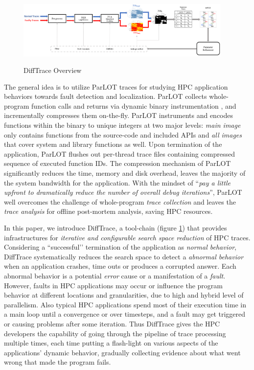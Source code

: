 \begin{figure}[]
\caption{DiffTrace Overview}
\includegraphics[width=0.95\textwidth]{figs/overview.png}
\label{fig.diffTraceOverview}
\end{figure}

The general idea is to utilize ParLOT \cite{ parlot} traces for studying HPC application behaviors towards fault detection and localization.
%
ParLOT collects whole-program function calls and returns via dynamic binary instrumentation \cite{pin}, and incrementally compresses them on-the-fly.
%
ParLOT instruments and encodes functions within the binary to unique integers at two major levels: \textit{main image} only contains functions from the source-code and included APIs and \textit{all images} that cover system and library functions as well.
%
Upon termination of the application, ParLOT flushes out per-thread trace files containing compressed sequence of executed function IDs.
%
The compression mechanism of ParLOT significantly reduces the time, memory and disk overhead, leaves the majority of the system bandwidth for the application. 
%
With the mindset of ``\textit{pay a little upfront to dramatically reduce the number of overall debug iterations}'', ParLOT well overcomes the challenge of whole-program \textit{trace collection} and leaves the \textit{trace analysis} for offline post-mortem analysis, saving HPC resources.
%

In this paper, we introduce DiffTrace, a tool-chain (figure \ref{fig.diffTraceOverview}) that provides infrastructures for \textit{iterative and configurable search space reduction} of HPC traces.
%
Considering a ``successful’’ termination of the application as \textit{normal behavior}, DiffTrace systematically reduces the search space to detect a \textit{abnormal behavior} when an application crashes, time outs or produces a corrupted answer.
%
Each abnormal behavior is a potential \textit{error} cause or a manifestation of a \textit{fault}.
%
However, faults in HPC applications may occur or influence the program behavior at different locations and granularities, due to high and hybrid level of parallelism.
%
Also typical HPC applications spend most of their execution time in a main loop until a convergence or over timesteps, and a fault may get  triggered or causing problems after some iteration.
%
 Thus DiffTrace gives the HPC developers the capability of going through the pipeline of trace processing multiple times, each time putting a flash-light on various aspects of the applications' dynamic behavior, gradually collecting evidence about what went wrong that made the program fails.

